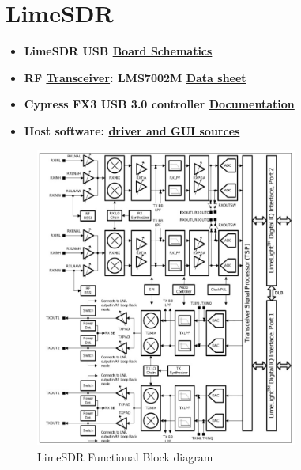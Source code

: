 \documentclass[class=report,11pt,crop=false]{standalone}
\begin{document}
\chapter{LimeSDR \label{Appendix-B} \vspace{0cm}}
\begin{itemize}[noitemsep,nolistsep]
    \item \textbf{LimeSDR USB \href{https://github.com/myriadrf/LimeSDR-USB/blob/master/hardware/plug/1v4/Project\%20Outputs\%20for\%20LimeSDR-USB_1v4_LMS031pad/LimeSDR-USB_1v4_schematic_r7.PDF}{Board Schematics}}
    \item \textbf{RF \href{https://github.com/myriadrf/LMS7002M-docs}{Transceiver}: LMS7002M  \href{https://github.com/myriadrf/LMS7002M-docs}{Data sheet}} 
    \item \textbf{Cypress FX3 USB 3.0 controller \href{https://github.com/myriadrf/LimeSDR-USB_FX3}{Documentation}} 
    \item \textbf{Host software: \href{https://github.com/MyriadRF/LimeSuite}{driver and GUI sources}}
\end{itemize}
\begin{figure}[h]
    \centering
    \includegraphics[width=0.77\textwidth]{Images/diagrams/limesdrblock.png}
    \caption{LimeSDR Functional Block diagram}
    \label{fig:my_label}
\end{figure}



\ifstandalone
% 
\fi
\end{document}
